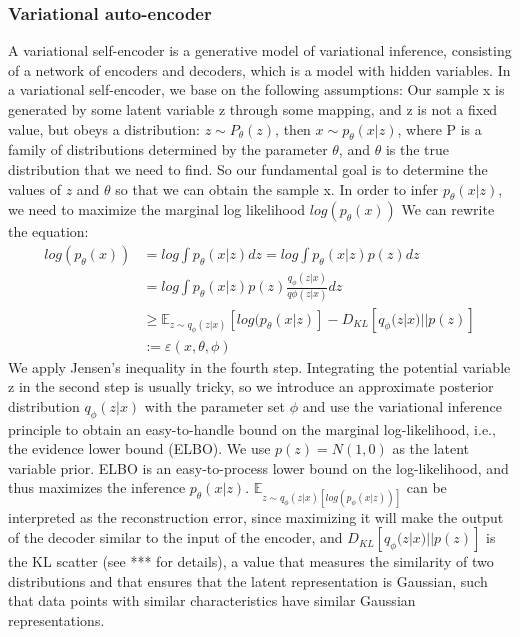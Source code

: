 \documentclass[%
reprint,
amsmath,amssymb,
aps,
]{revtex4-2}
\begin{document}
	\subsubsection{Variational auto-encoder}
	A variational self-encoder is a generative model of variational inference, consisting of a network of encoders and decoders, which is a model with hidden variables. In a variational self-encoder, we base on the following assumptions:
	Our sample x is generated by some latent variable z through some mapping, and z is not a fixed value, but obeys a distribution: $z \sim P_{\theta}(z)$, then $x \sim p_{\theta}(x|z)$, where P is a family of distributions determined by the parameter $\theta$, and $ \theta$ is the true distribution that we need to find. So our fundamental goal is to determine the values of $z$ and $\theta$ so that we can obtain the sample x. In order to infer $p_{\theta}(x|z)$, we need to maximize the marginal log likelihood $log(p_{\theta}(x))$ We can rewrite the equation:
	\begin{equation}\label{vae}
		\begin{aligned}
			log(p_{\theta}(x)) &= log \int p_{\theta}(x|z)dz = log \int p_{\theta}(x|z)p(z)dz \\
			&= log \int p_{\theta}(x|z)p(z)\frac{q_{\phi}(z|x)}{q{\phi}(z|x)}dz\\
			&\ge \mathbb E_{z \sim q_{\phi}(z|x)}[log(p_{\theta}(x|z)] - D_{KL}[q_{\phi}(z|x)||p(z)]\\
			&:= \varepsilon(x,\theta,\phi)
		\end{aligned}
	\end{equation}
	We apply Jensen's inequality in the fourth step. Integrating the potential variable z in the second step is usually tricky, so we introduce an approximate posterior distribution $q_{\phi}(z|x)$ with the parameter set $\phi$ and use the variational inference principle to obtain an easy-to-handle bound on the marginal log-likelihood, i.e., the evidence lower bound (ELBO). We use $p(z)=N(1,0)$ as the latent variable prior. ELBO is an easy-to-process lower bound on the log-likelihood, and thus maximizes the inference $p_{\theta}(x|z)$. $\mathbb E_{z \sim q_{\phi}(z|x)[log(p_{\phi}(x|z))]}$ can be interpreted as the reconstruction error, since maximizing it will make the output of the decoder similar to the input of the encoder, and $D_{KL}[q_{\phi}(z|x)||p(z)]$ is the KL scatter (see *** for details), a value that measures the similarity of two distributions and that ensures that the latent representation is Gaussian, such that data points with similar characteristics have similar Gaussian representations.
\end{document}

